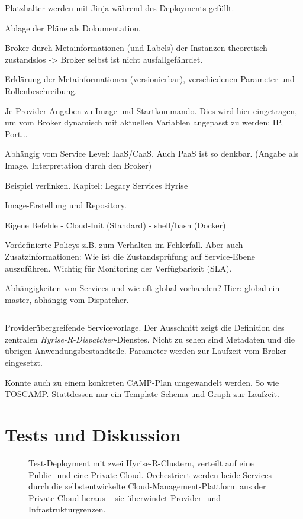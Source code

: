 Platzhalter werden mit Jinja während des Deployments gefüllt.

Ablage der Pläne als Dokumentation.

Broker durch Metainformationen (und Labels) der Instanzen theoretisch zustandslos -> Broker selbst ist nicht ausfallgefährdet.

Erklärung der Metainformationen (versionierbar), verschiedenen Parameter und Rollenbeschreibung.

Je Provider Angaben zu Image und Startkommando. Dies wird hier eingetragen, um vom Broker dynamisch mit aktuellen Variablen angepasst zu werden: IP, Port...

Abhängig vom Service Level: IaaS/CaaS. Auch PaaS ist so denkbar. (Angabe als Image, Interpretation durch den Broker)

Beispiel verlinken.
Kapitel: Legacy Services Hyrise

Image-Erstellung und Repository.

Eigene Befehle
- Cloud-Init (Standard)
- shell/bash (Docker)

Vordefinierte Policys z.B. zum Verhalten im Fehlerfall. Aber auch Zusatzinformationen: Wie ist die Zustandsprüfung auf Service-Ebene auszuführen. Wichtig für Monitoring der Verfügbarkeit (SLA).

Abhängigkeiten von Services und wie oft global vorhanden? Hier: global ein master, abhängig vom Dispatcher.


\begin{listing}[ht]	
	\inputminted[firstline=15]{yaml}{./src/hyrise-r.sample.yaml}
	\caption{Providerübergreifende Servicevorlage. Der Ausschnitt zeigt die Definition des zentralen \emph{Hyrise-R-Dispatcher}-Dienstes. Nicht zu sehen sind Metadaten und die übrigen Anwendungsbestandteile. Parameter werden zur Laufzeit vom Broker eingesetzt.}
	\label{listing:hyrise-r}
\end{listing}

Könnte auch zu einem konkreten CAMP-Plan umgewandelt werden. So wie TOSCAMP. Stattdessen nur ein Template Schema und Graph zur Laufzeit.


\section{Tests und Diskussion}

\begin{figure}[ht]
	\centering
	\def\svgwidth{0.75\textwidth}
	{\footnotesize \textsf{
			}}
	\caption{Test-Deployment mit zwei Hyrise-R-Clustern, verteilt auf eine Public- und eine Private-Cloud. Orchestriert werden beide Services durch die selbstentwickelte Cloud-Management-Plattform aus der Private-Cloud heraus -- sie überwindet Provider- und Infrastrukturgrenzen.}	
	\label{fig:hyrise-r-deployment}
\end{figure}

